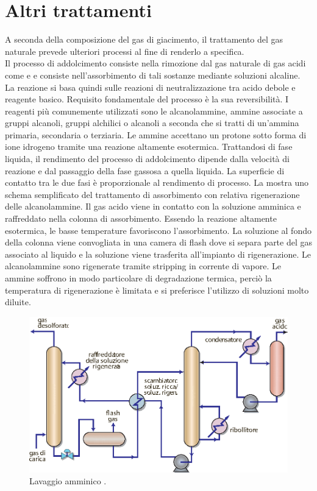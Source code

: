 \section{Altri trattamenti}
A seconda della composizione del gas di giacimento, il trattamento del gas naturale prevede ulteriori processi al fine di renderlo a specifica. \\
Il processo di addolcimento consiste nella rimozione dal gas naturale di gas acidi come  e  e consiste nell'assorbimento di tali sostanze mediante soluzioni alcaline. La reazione si basa quindi sulle reazioni di neutralizzazione tra acido debole e reagente basico. Requisito fondamentale del processo è la sua reversibilità. 
I reagenti più comunemente utilizzati sono le alcanolammine, ammine associate a gruppi alcanoli, gruppi alchilici o alcanoli a seconda che si tratti di un'ammina primaria, secondaria o terziaria. Le ammine accettano un protone sotto forma di ione idrogeno  tramite una reazione altamente esotermica. Trattandosi di fase liquida, il rendimento del processo di addolcimento dipende dalla velocità di reazione e dal passaggio della fase gassosa a quella liquida. La superficie di contatto tra le due fasi è proporzionale al rendimento di processo. La  mostra uno schema semplificato del trattamento di assorbimento con relativa rigenerazione delle alcanolammine. Il gas acido viene in contatto con la soluzione amminica e raffreddato nella colonna di assorbimento. Essendo la reazione altamente esotermica, le basse temperature favoriscono l'assorbimento. La soluzione al fondo della colonna viene convogliata in una camera di flash dove si separa parte del gas associato al liquido e la soluzione viene trasferita all'impianto di rigenerazione. Le alcanolammine sono rigenerate tramite stripping in corrente di vapore. Le ammine soffrono in modo particolare di degradazione termica, perciò la temperatura di rigenerazione è limitata e si preferisce l'utilizzo di soluzioni molto diluite.\\
\begin{figure}[htbp]
    \centering
    \includegraphics[width=.7\textwidth]{fig/impianti/ammine.eps}
    \caption{Lavaggio amminico \parencite{bianco2005impiantigas}.}
    \label{fig:ammine}
\end{figure}

